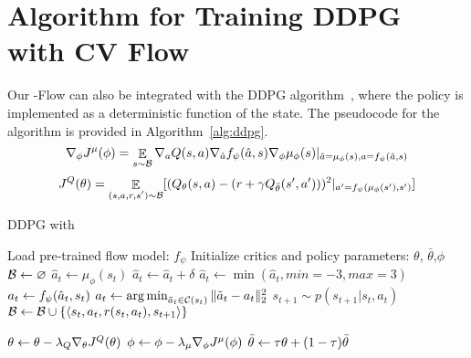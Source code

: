 \section{Algorithm for Training DDPG with CV Flow}\label{sup:ddpg}
Our \ourcv-Flow can also be integrated with the DDPG algorithm~\cite{lillicrap2015continuous}, where the policy is implemented as a deterministic function of the state. The pseudocode for the algorithm is provided in Algorithm~\ref{alg:ddpg}.
\vskip -1pt
{
\small
\begin{equation}
\nabla_\phi J^{\mu}(\phi) = \operatorname*{\mathop{\mathbb{E}}}_{s\sim \mathcal{B}} \nabla_a Q(s, a)  \nabla_{\hat{a}}  f_\psi(\hat{a},s) \nabla_\phi \mu_\phi(s)|_{\hat{a}=\mu_\phi(s),a=f_\psi(\hat{a},s)}    \\
\label{eq:ddpg_policy_loss}
\end{equation}
}
\vskip -1pt
{
\small
\begin{align}\label{eq:ddpg_critic_loss}
J^{Q}(\theta)=\operatorname*{\mathop{\mathbb{E}}}_{\substack{(s,{a},r,s')\sim \mathcal{B}}}
[(
Q_{\theta}(s,{a}) -(r+\gamma Q_{\bar{\theta}}(s',a'
)
)
)^{2}|_{a' = f_\psi(\mu_{\phi}(s'), s')}]
\end{align}
}
\begin{algorithm}[ht]
\caption{ DDPG with \our}
\label{alg:ddpg}
\begin{algorithmic}[1]
\STATE Load pre-trained flow model: $f_\psi$
\STATE Initialize critics and policy parameters: $\theta$, $\bar{\theta}$,$\phi$
\STATE $\mathcal{B} \leftarrow \varnothing$ 
	\STATE $\hat{a}_t \leftarrow \mu_\phi(s_t)$ 
        \STATE $\hat{a}_t \leftarrow \hat{a}_t + \delta$  
	\STATE $\hat{a}_t \leftarrow  \min(\hat{a}_t, min=-3, max=3)$ 
        \STATE $a_t \leftarrow f_\psi(\hat{a}_t,s_t)$ 
            \STATE $a_t \leftarrow \operatorname*{arg\,min}_{\tilde{a}_t \in \mathcal{C}(s_t)} \|\tilde{a}_t - a_t\|^2_2$ 
        \ENDIF
	\STATE $s_{t+1} \sim p(s_{t+1}| s_t, a_t)$ 
	\STATE $\mathcal{B} \leftarrow \mathcal{B} \cup \left\{\langle s_t, {a}_t, r(s_t, a_t), s_{t+1}\rangle\right\}$
	\ENDFOR
 
        \STATE $\theta \leftarrow \theta - \lambda_Q \nabla_\theta J^Q(\theta)$ 
        \STATE $\phi \leftarrow \phi - \lambda_\mu \nabla_\phi J^\mu(\phi)$ 
        \STATE $\bar{\theta} \leftarrow \tau \theta + (1-\tau){\bar{\theta}} $ 
	\ENDFOR
\ENDFOR
\end{algorithmic}
\end{algorithm}


